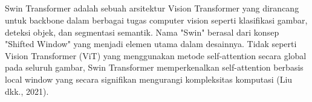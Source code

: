 \subsection{\swin}
\label{subsec:swin}

Swin Transformer adalah sebuah arsitektur Vision Transformer yang 
dirancang untuk backbone dalam berbagai tugas computer vision seperti klasifikasi 
gambar, deteksi objek, dan segmentasi semantik. Nama "Swin" berasal dari konsep 
"Shifted Window" yang menjadi elemen utama dalam desainnya. Tidak seperti 
Vision Transformer (ViT) yang menggunakan metode self-attention secara global 
pada seluruh gambar, Swin Transformer memperkenalkan self-attention berbasis 
local window yang secara signifikan mengurangi kompleksitas komputasi (Liu dkk., 2021).